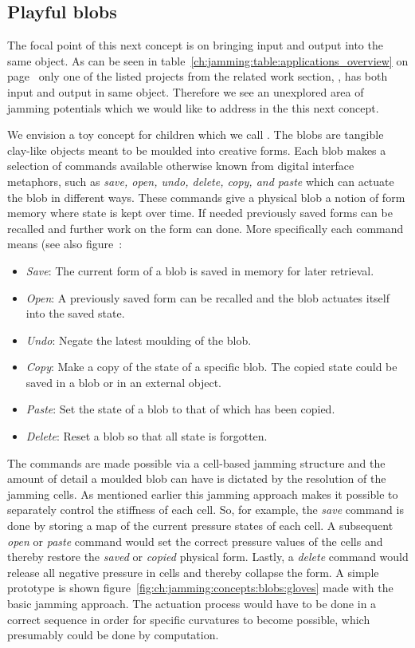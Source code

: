 \subsection{Playful blobs}
\label{ch:jamming:concepts:playful_blobs}

The focal point of this next concept is on bringing input and output into the same object.
As can be seen in table~\ref{ch:jamming:table:applications_overview} on page~\pageref{ch:jamming:table:applications_overview} only one of the listed projects from the related work section, , has both input and output in same object.
Therefore we see an unexplored area of jamming potentials which we would like to address in the this next concept.

We envision a toy concept for children which we call .
The blobs are tangible clay-like objects meant to be moulded into creative forms.
Each blob makes a selection of commands available otherwise known from digital interface metaphors, such as \emph{save, open, undo, delete, copy, and paste} which can actuate the blob in different ways.
These commands give a physical blob a notion of form memory where state is kept over time.
If needed previously saved forms can be recalled and further work on the form can done.
More specifically each command means (see also figure~:
\begin{itemize}
	\item{\emph{Save}: The current form of a blob is saved in memory for later retrieval.}
	\item{\emph{Open}: A previously saved form can be recalled and the blob actuates itself into the saved state.}
	\item{\emph{Undo}: Negate the latest moulding of the blob.}
	\item{\emph{Copy}: Make a copy of the state of a specific blob. The copied state could be saved in a blob or in an external object.}
	\item{\emph{Paste}: Set the state of a blob to that of which has been copied.} 
	\item{\emph{Delete}: Reset a blob so that all state is forgotten.} 
\end{itemize}
The commands are made possible via a cell-based jamming structure and the amount of detail a moulded blob can have is dictated by the resolution of the jamming cells.
As mentioned earlier this jamming approach makes it possible to separately control the stiffness of each cell.
So, for example, the \emph{save} command is done by storing a map of the current pressure states of each cell.
A subsequent \emph{open} or \emph{paste} command would set the correct pressure values of the cells and thereby restore the \emph{saved} or \emph{copied} physical form.
Lastly, a \emph{delete} command would release all negative pressure in cells and thereby collapse the form.
A simple prototype is shown figure~\ref{fig:ch:jamming:concepts:blobs:gloves} made with the basic jamming approach.
The actuation process would have to be done in a correct sequence in order for specific curvatures to become possible, which presumably could be done by computation.

